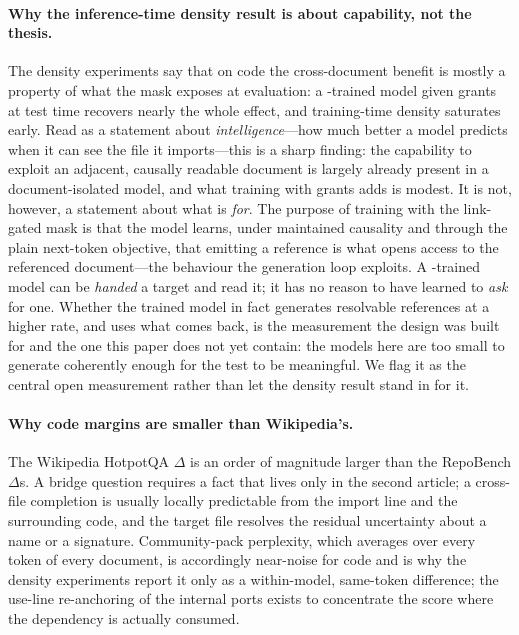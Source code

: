 \paragraph{Why the inference-time density result is about capability, not the thesis.}
The density experiments say that on code the cross-document benefit is mostly a
property of what the mask exposes at evaluation: a \doccausal-trained model given
\crossdoc grants at test time recovers nearly the whole effect, and training-time
density saturates early. Read as a statement about \emph{intelligence}---how much
better a model predicts when it can see the file it imports---this is a sharp finding:
the capability to exploit an adjacent, causally readable document is largely already
present in a document-isolated model, and what training with grants adds is modest.
It is not, however, a statement about what \crossdoc is \emph{for}. The purpose of
training with the link-gated mask is that the model learns, under maintained
causality and through the plain next-token objective, that emitting a reference is
what opens access to the referenced document---the behaviour the generation loop
exploits. A \doccausal-trained model can be \emph{handed} a target and read it; it has
no reason to have learned to \emph{ask} for one. Whether the trained model in fact
generates resolvable references at a higher rate, and uses what comes back, is the
measurement the design was built for and the one this paper does not yet contain: the
models here are too small to generate coherently enough for the test to be meaningful.
We flag it as the central open measurement rather than let the density result stand in
for it.

\paragraph{Why code margins are smaller than Wikipedia's.}
The Wikipedia HotpotQA $\Delta$ is an order of magnitude larger than the RepoBench
$\Delta$s. A bridge question requires a fact that lives only in the second article; a
cross-file completion is usually locally predictable from the import line and the
surrounding code, and the target file resolves the residual uncertainty about a name
or a signature. Community-pack perplexity, which averages over every token of every
document, is accordingly near-noise for code and is why the density experiments report
it only as a within-model, same-token difference; the use-line re-anchoring of the
internal ports exists to concentrate the score where the dependency is actually
consumed.

